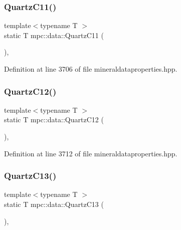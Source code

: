 \subsubsection{\texorpdfstring{Quartz\+C11()}{QuartzC11()}}
{\footnotesize\ttfamily template$<$typename T $>$ \\
static T mpc\+::data\+::\+Quartz\+C11 (\begin{DoxyParamCaption}{ }\end{DoxyParamCaption})\hspace{0.3cm}{\ttfamily [inline]}, {\ttfamily [static]}}



Definition at line 3706 of file mineraldataproperties.\+hpp.

\mbox{\label{namespacempc_1_1data_a86c5e86442a51cd3acc7a7372df10ada}} 
\subsubsection{\texorpdfstring{Quartz\+C12()}{QuartzC12()}}
{\footnotesize\ttfamily template$<$typename T $>$ \\
static T mpc\+::data\+::\+Quartz\+C12 (\begin{DoxyParamCaption}{ }\end{DoxyParamCaption})\hspace{0.3cm}{\ttfamily [inline]}, {\ttfamily [static]}}



Definition at line 3712 of file mineraldataproperties.\+hpp.

\mbox{\label{namespacempc_1_1data_a625fcdf103d4b918b92c4e32cf14e2bf}} 
\subsubsection{\texorpdfstring{Quartz\+C13()}{QuartzC13()}}
{\footnotesize\ttfamily template$<$typename T $>$ \\
static T mpc\+::data\+::\+Quartz\+C13 (\begin{DoxyParamCaption}{ }\end{DoxyParamCaption})\hspace{0.3cm}{\ttfamily [inline]}, {\ttfamily [static]}}



